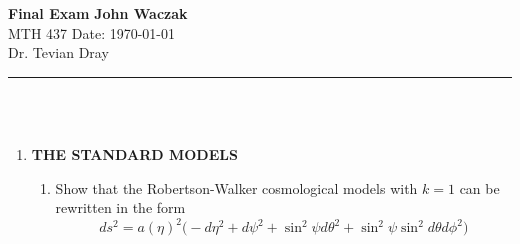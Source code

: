 \documentclass[a4paper, 11pt]{article}
\begin{document}
\noindent
\large\textbf{Final Exam} \hfill \textbf{John Waczak} \\
\normalsize MTH 437 \hfill  Date: \today \\
Dr. Tevian Dray %
\par\noindent\rule{\textwidth}{0.4pt} \\\\


\begin{enumerate}[leftmargin=0em, label=\textbf{\arabic*}.]
\item \textbf{THE STANDARD MODELS}\\
  \begin{enumerate}[leftmargin=2em, label=(\textbf{\alph*})]
  \item Show that the Robertson-Walker cosmological models with $k=1$
    can be rewritten in the form
    \begin{equation}
      ds^2 = a(\eta)^2\Big(-d\eta^2+d\psi^2+\sin^2\psi d\theta^2 + \sin^2\psi\sin^2d\theta d\phi^2 \Big)
    \end{equation}


\end{enumerate}
\end{enumerate}
\end{document}
